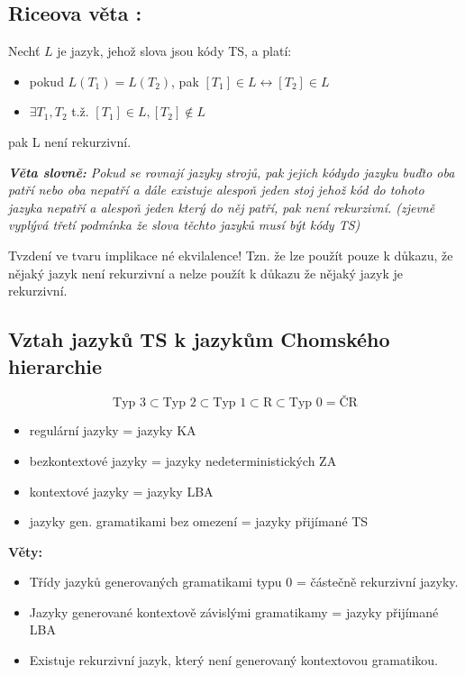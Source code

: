\documentclass[10pt,a4paper]{article}
\theoremstyle{note}
\begin{document}
	\subsection{Riceova věta :}

	Nechť $L$ je jazyk, jehož slova jsou kódy TS, a platí:
	\begin{itemize}
		\item pokud $L(T_{1}) = L(T_{2})$, pak $[T_{1}] \in L \leftrightarrow [T_{2}] \in L $
		\item $\exists T_{1},T_{2}$ t.ž. $ [T_{1}] \in L, [T_{2}] \notin L$
	\end{itemize}
	pak L není rekurzivní.\\
	\vspace{0,5cm}

	\textit{\textbf{Věta slovně:} Pokud se rovnají jazyky strojů, pak jejich kódydo jazyku buďto oba
				patří nebo oba nepatří a dále existuje alespoň jeden stoj jehož kód do tohoto jazyka nepatří a
				 alespoň jeden který do něj patří, pak není rekurzivní. (zjevně vyplývá třetí podmínka že slova
				 těchto jazyků musí být kódy TS)}\\

	\vspace{0,5cm}

	Tvzdení ve tvaru implikace né ekvilalence! Tzn. že lze použít pouze k důkazu, že nějaký jazyk není rekurzivní a nelze použít
	k důkazu že nějaký jazyk je rekurzivní.


	\subsection{Vztah jazyků TS k jazykům Chomského hierarchie}

		\vspace{5mm}
		$$\text{Typ 3} \subset \text{Typ 2} \subset \text{Typ 1} \subset \text{R} \subset \text{Typ 0} = \text{ČR} $$
		\begin{itemize}
		\item regulární jazyky = jazyky KA
		\item bezkontextové jazyky = jazyky nedeterministických ZA
		\item kontextové jazyky = jazyky LBA
		\item jazyky gen. gramatikami bez omezení = jazyky přijímané TS
		\end{itemize}


		\textbf{Věty: }
		\begin{itemize}
		\item Třídy jazyků generovaných gramatikami typu 0 = částečně rekurzivní jazyky.
		\item Jazyky generované kontextově závislými gramatikamy = jazyky přijímané LBA
		\item Existuje rekurzivní jazyk, který není generovaný kontextovou gramatikou.
		\end{itemize}
\end{document}
